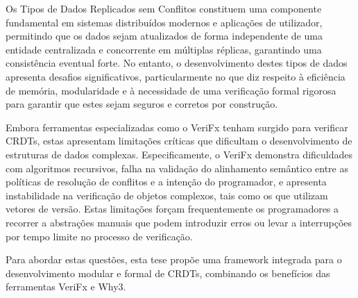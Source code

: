 

Os Tipos de Dados Replicados sem Conflitos constituem uma componente fundamental em sistemas distribuídos modernos e aplicações de utilizador, permitindo que os dados sejam atualizados de forma independente de uma entidade centralizada e concorrente em múltiplas réplicas, garantindo uma consistência eventual forte. No entanto, o desenvolvimento destes tipos de dados apresenta desafios significativos, particularmente no que diz respeito à eficiência de memória, modularidade e à necessidade de uma verificação formal rigorosa para garantir que estes sejam seguros e corretos por construção.

Embora ferramentas especializadas como o VeriFx tenham surgido para verificar CRDTs, estas apresentam limitações críticas que dificultam o desenvolvimento de estruturas de dados complexas. Especificamente, o VeriFx demonstra dificuldades com algoritmos recursivos, falha na validação do alinhamento semântico entre as políticas de resolução de conflitos e a intenção do programador, e apresenta instabilidade na verificação de objetos complexos, tais como os que utilizam vetores de versão. Estas limitações forçam frequentemente os programadores a recorrer a abstrações manuais que podem introduzir erros ou levar a interrupções por tempo limite no processo de verificação.

Para abordar estas questões, esta tese propõe uma framework integrada para o desenvolvimento modular e formal de CRDTs, combinando os benefícios das ferramentas VeriFx e Why3.


